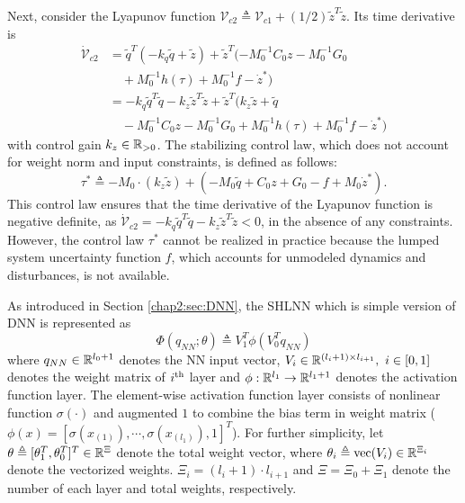 Next, consider the Lyapunov function ${\mathcal V}_{c2}\triangleq {\mathcal V}_{c1} + (1/2) {\tilde z}^T  {\tilde z}$.
Its time derivative is
\begin{equation}
    \begin{aligned}
    \dot {\mathcal V}_{c2} &=
    {\tilde q}^T  (-{k_q}{\tilde q}+{\tilde z}) +{\tilde z}^T  (-M_0^{-1} C _0{z} -M_0^{-1} G_0\\
    &\quad
    +M_0^{-1}h(\tau)+M_0^{-1} f- \dot z^*)\\
    &= -{k_q}{\tilde q}^T  {\tilde q} -{k_z}{\tilde z}^T  {\tilde z} +{\tilde z}^T  ({k_z}{\tilde z}+{\tilde q}\\
    &\quad-M_0^{-1} C_0{z} -M_0^{-1} G_0+M_0^{-1} h(\tau)+M_0^{-1} f- \dot z^* )
    \end{aligned}
\end{equation}
with control gain ${k_z}\in\mathbb{R}_{>0}$. 
The stabilizing control law, which does not account for weight norm and input constraints, is defined as follows:
\begin{equation}
    \tau^* \triangleq-M_0\cdot ({k_z}{\tilde z})+ 
    ( 
        -M_0{\tilde q}+C_0{z}+G_0-f+M_0 \dot z^*
    ).
    \label{chap3:eq:desired_control}
\end{equation}
This control law ensures that the time derivative of the Lyapunov function is negative definite, as $\dot {\mathcal V}_{c2} = -{k_q}{\tilde q}^T  {\tilde q}-{k_z}{\tilde z}^T  {\tilde z}<0$, in the absence of any constraints. However, the control law $\tau^*$ cannot be realized in practice because the lumped system uncertainty function $f$, which accounts for unmodeled dynamics and disturbances, is not available.

As introduced in Section \ref{chap2:sec:DNN}, the SHLNN which is simple version of DNN is represented as 
\begin{equation}
    \Phi({q_{NN}};\theta)\triangleq V_1^T\phi(V_0^T{q_{NN}})
\end{equation}
where ${q_{NN}}\in\mathbb{R}^{l_0+1}$ denotes the NN input vector, $V_i\in\mathbb{R}^{(l_i+1)\times l_{i+1}},\ i\in[0,1]$ denotes the weight matrix of $i\textsuperscript{th}$ layer and $\phi:\mathbb{R}^{l_1}\to\mathbb{R}^{l_1+1}$ denotes the activation function layer.
The element-wise activation function layer consists of nonlinear function $\sigma(\cdot)$ and augmented $1$ to combine the bias term in weight matrix (\ie $\phi(x) = [\sigma(x_{(1)}),\cdots, \sigma(x_{(l_1)}), 1]^T$).
For further simplicity, let $\theta\triangleq[\theta_1^T,\theta_0^T]^T\in\mathbb{R}^{\Xi}$ denote the total weight vector, where $\theta_i\triangleq \text{vec}(V_i)\in\mathbb{R}^{\Xi_i}$ denote the vectorized weights.
$\Xi_i=(l_i+1)\cdot l_{i+1}$ and $\Xi=\Xi_0+\Xi_1$ denote the number of each layer and total weights, respectively.

